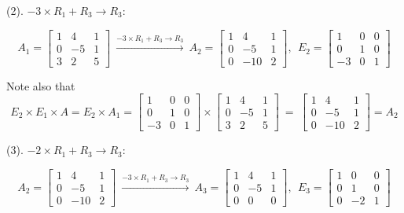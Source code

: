 \documentclass[
]{book}
\begin{document}
(2). \(-3\times R_1 + R_3 \to R_3\):

\[
A_1= \left[\begin{array}{ccccc} 
1 & 4 & 1   \\ 
0 & -5 & 1  \\ 
3 & 2 & 5  
\end{array}
\right]
~
\xrightarrow{-3\times R_1 + R_3 \to R_3}
~
A_2= \left[\begin{array}{ccccc} 
1 & 4 & 1   \\ 
0 & -5 & 1  \\ 
0 & -10 & 2  
\end{array}
\right],
~~
E_2 =\left[\begin{array}{ccccc} 
1 & 0 & 0   \\ 
0 & 1 & 0  \\ 
-3 & 0 & 1  
\end{array}
\right]
\]

Note also that
\[
E_2\times E_1\times A = E_2\times A_1 = \left[\begin{array}{ccccc} 
1 & 0 & 0   \\ 
0 & 1 & 0  \\ 
-3 & 0 & 1  
\end{array}
\right]
\times
\left[\begin{array}{ccccc} 
1 & 4 & 1   \\ 
0 & -5 & 1  \\ 
3 & 2 & 5  
\end{array}
\right]
~=~
\left[\begin{array}{ccccc} 
1 & 4 & 1   \\ 
0 & -5 & 1  \\ 
0 & -10 & 2  
\end{array}
\right] = A_2
\]

(3). \(-2\times R_1 + R_3 \to R_3\):

\[
A_2= \left[\begin{array}{ccccc} 
1 & 4 & 1   \\ 
0 & -5 & 1  \\ 
0 & -10 & 2  
\end{array}
\right]
~
\xrightarrow{-3\times R_1 + R_3 \to R_3}
~
A_3= \left[\begin{array}{ccccc} 
1 & 4 & 1   \\ 
0 & -5 & 1  \\ 
0 & 0 & 0  
\end{array}
\right],
~~
E_3 =\left[\begin{array}{ccccc} 
1 & 0 & 0   \\ 
0 & 1 & 0  \\ 
0 & -2 & 1  
\end{array}
\right]
\]
\end{document}
